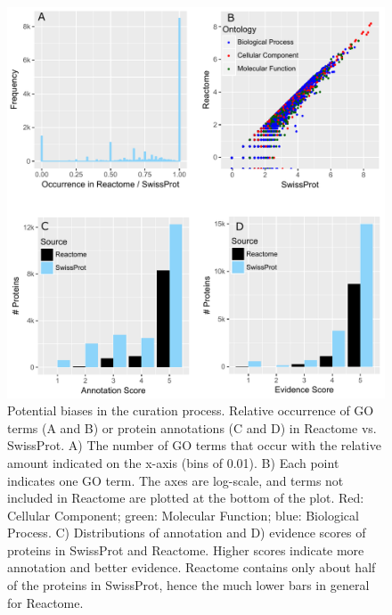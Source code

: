 \documentclass[10pt]{article}
\begin{document}
\begin{figure}
  \centering
  \includegraphics[width=\textwidth]{../S5/FigureS6.pdf}
  \caption{Potential biases in the curation process. Relative
    occurrence of GO terms (A and B) or protein annotations (C and D)
    in Reactome vs. SwissProt. A) The number of GO terms that occur
    with the relative amount indicated on the x-axis (bins of
    0.01). B) Each point indicates one GO term. The axes are
    log-scale, and terms not included in Reactome are plotted at the
    bottom of the plot. Red: Cellular Component; green: Molecular
    Function; blue: Biological Process. C) Distributions of annotation
    and D) evidence scores of proteins in SwissProt and
    Reactome. Higher scores indicate more annotation and better
    evidence. Reactome contains only about half of the proteins in
    SwissProt, hence the much lower bars in general for Reactome.}
  \label{fig:s6}
\end{figure}

\clearpage
\end{document}

